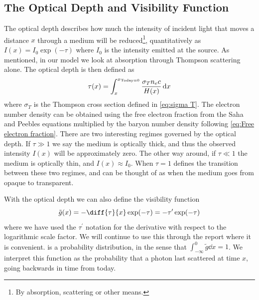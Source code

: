 \documentclass[10pt,a4paper]{article}
\begin{document}
\subsection{The Optical Depth and Visibility Function}
\label{subsec:Theory/tau and g}
The optical depth describes how much the intensity of incident light that moves a distance $x$ through a medium will be reduced\footnote{By absorption, scattering or other means.}, quantitatively as $I(x) = I_0 \exp(-\tau)$ where $I_0$ is the intensity emitted at the source. As mentioned, in our model we look at absorption through Thompson scattering alone. The optical depth is then defined as
\begin{equation}
    \tau(x) = \int_x^{x_{\rm{Today}=0}} \frac{\sigma_T n_e c}{H(x)}\dd{x}
    \label{eq:tau integration}
\end{equation}
where $\sigma_T$ is the Thompson cross section defined in \cref{eq:sigma T}. The electron number density can be obtained using the free electron fraction from the Saha and Peebles equations multiplied by the baryon number density following \cref{eq:Free electron fraction}. There are two interesting regimes governed by the optical depth. If $\tau \gg 1$ we say the medium is optically thick, and thus the observed intensity $I(x)$ will be approximately zero. The other way around, if $\tau \ll 1$ the medium is optically thin, and $I(x) \approx I_0$. When $\tau  = 1$ defines the transition between these two regimes, and can be thought of as when the medium goes from opaque to transparent.

With the optical depth we can also define the visibility function
\begin{equation}
    \tilde{g}(x) = - \diff{\tau}{x}\exp(-\tau) = -\tau^\prime \exp(-\tau)
    \label{eq:visibility function}
\end{equation}
where we have used the $\tau^\prime$ notation for the derivative with respect to the logarithmic scale factor. We will continue to use this through the report where it is convenient.  is a probability distribution, in the sense that $\int_{-\infty}^0 \tilde{g}\dd x = 1$. We interpret this function as the probability that a photon last scattered at time $x$, going backwards in time from today.
\end{document}

